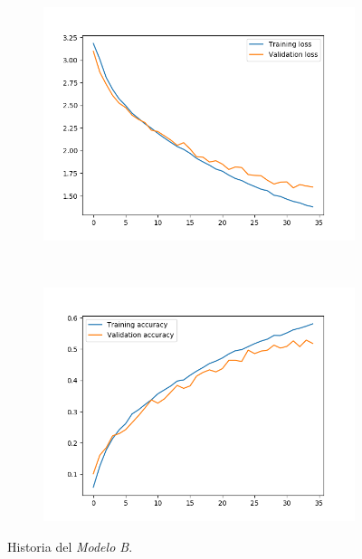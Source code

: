 \documentclass[11pt,a4paper]{article}
\begin{document}
\begin{figure}[H]
  \centering
  \begin{subfigure}{.5\textwidth}
    \centering
    \includegraphics[scale=0.4]{img/deep2-drop-loss-35.png}
    \label{fig:deep2-drop-loss-35}
  \end{subfigure}%
  ~ \quad
  \begin{subfigure}{.5\textwidth}
    \centering
    \includegraphics[scale=0.4]{img/deep2-drop-acc-35.png}
    \label{fig:deep2-drop-acc-35}
  \end{subfigure}
  \caption{Historia del \textit{Modelo B}.}
  \label{fig:history-deep2-drop-35}
\end{figure}
\end{document}

